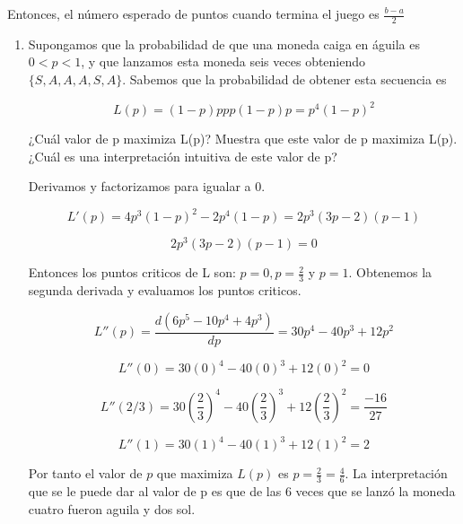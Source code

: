 \documentclass[12pt]{exam}
\begin{document}
\begin{enumerate}
\begin{enumerate}[label=d.]
\justify
Entonces, el número esperado de puntos cuando termina el juego es $\frac{b-a}{2}$

\end{enumerate}


\begin{enumerate}[label=d.]
\item Supongamos que la probabilidad de que una moneda caiga en \'aguila es $0 < p < 1$, y que lanzamos esta moneda seis veces obteniendo $\{S,A,A,A,S,A\}$. Sabemos que la probabilidad de obtener esta secuencia es

\begin{equation}
    L(p) = (1-p)ppp(1-p)p = p^4(1-p)^2
\end{equation}

\justify
\mbox{¿}Cu\'al valor de p maximiza L(p)? Muestra que este valor de p maximiza L(p). ¿Cu\'al es una interpretaci\'on intuitiva de este valor de p?

\justify
Derivamos y factorizamos para igualar a 0.

\begin{equation}
    L'(p) = 4p^3(1-p)^2 - 2p^4(1-p) = 2p^3(3p - 2)(p - 1)
\end{equation}

\begin{equation}
    2p^3(3p - 2)(p - 1) = 0
\end{equation}

\justify
Entonces los puntos criticos de L son: $p = 0, p = \frac{2}{3}$ y $p = 1$. Obtenemos la segunda derivada y evaluamos los puntos criticos.

\begin{equation}
    L''(p) = \frac{d(6p^5 - 10p^4 + 4p^3)}{dp}= 30p^4 - 40p^3 + 12p^2
\end{equation}

\begin{equation}
    L''(0) = 30(0)^4 - 40(0)^3 + 12(0)^2 = 0
\end{equation}

\begin{equation}
    L''(2/3) = 30(\frac{2}{3})^4 - 40(\frac{2}{3})^3 + 12(\frac{2}{3})^2 = \frac{-16}{27}
\end{equation}

\begin{equation}
    L''(1) = 30(1)^4 - 40(1)^3 + 12(1)^2 = 2
\end{equation}

\justify
Por tanto el valor de $p$ que maximiza $L(p)$ es $p = \frac{2}{3} = \frac{4}{6}$. La interpretaci\'on que se le puede dar al valor de p es que de las 6 veces que se lanz\'o la moneda cuatro fueron aguila y dos sol.


\end{enumerate}
\end{enumerate}
\end{document}
